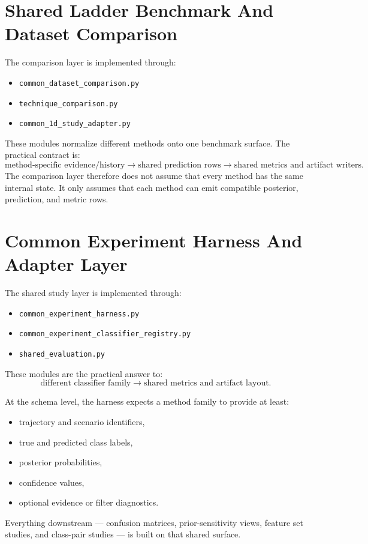 \documentclass[11pt]{article}
\begin{document}
\section{Shared Ladder Benchmark And Dataset Comparison}

The comparison layer is implemented through:
\begin{itemize}[leftmargin=1.5em]
    \item \texttt{common\_dataset\_comparison.py}
    \item \texttt{technique\_comparison.py}
    \item \texttt{common\_1d\_study\_adapter.py}
\end{itemize}

These modules normalize different methods onto one benchmark surface. The
practical contract is:
\begin{equation}
    \text{method-specific evidence/history}
    \rightarrow
    \text{shared prediction rows}
    \rightarrow
    \text{shared metrics and artifact writers}.
\end{equation}
The comparison layer therefore does not assume that every method has the same
internal state. It only assumes that each method can emit compatible posterior,
prediction, and metric rows.

\section{Common Experiment Harness And Adapter Layer}

The shared study layer is implemented through:
\begin{itemize}[leftmargin=1.5em]
    \item \texttt{common\_experiment\_harness.py}
    \item \texttt{common\_experiment\_classifier\_registry.py}
    \item \texttt{shared\_evaluation.py}
\end{itemize}

These modules are the practical answer to:
\begin{equation}
    \text{different classifier family}
    \rightarrow
    \text{shared metrics and artifact layout}.
\end{equation}

At the schema level, the harness expects a method family to provide at least:
\begin{itemize}[leftmargin=1.5em]
    \item trajectory and scenario identifiers,
    \item true and predicted class labels,
    \item posterior probabilities,
    \item confidence values,
    \item optional evidence or filter diagnostics.
\end{itemize}
Everything downstream --- confusion matrices, prior-sensitivity views, feature
set studies, and class-pair studies --- is built on that shared surface.
\end{document}

